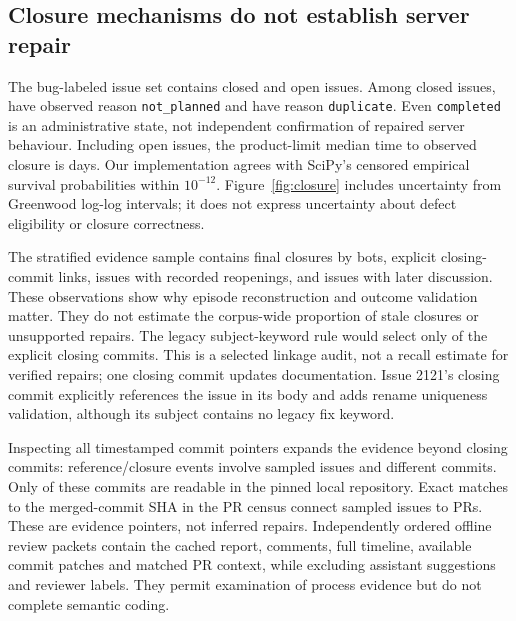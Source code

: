 \documentclass[11pt]{article}
\begin{document}
\subsection{Closure mechanisms do not establish server repair}
The bug-labeled issue set contains \BugClosedCount{} closed and
\BugOpenCount{} open issues. Among closed issues, \BugNotPlannedCount{} have
observed reason \texttt{not\_planned} and \BugDuplicateCount{} have reason
\texttt{duplicate}. Even \texttt{completed} is an administrative state, not
independent confirmation of repaired server behaviour. Including open issues,
the product-limit median time to observed closure is \BugClosureMedian{} days.
Our implementation agrees with SciPy's censored empirical survival probabilities
within $10^{-12}$. Figure~\ref{fig:closure} includes uncertainty from Greenwood
log-log intervals; it does not express uncertainty about defect eligibility or
closure correctness.

The stratified evidence sample contains \EvidenceBotClosures{} final closures
by bots, \EvidenceClosingCommits{} explicit closing-commit links,
\EvidenceReopened{} issues with recorded reopenings, and
\EvidencePostClosureDiscussion{} issues with later discussion. These observations
show why episode reconstruction and outcome validation matter. They do not
estimate the corpus-wide proportion of stale closures or unsupported repairs.
The legacy subject-keyword rule would select only
\ClosingCommitKeywordMatches{} of the \ClosingCommitKeywordCases{} explicit
closing commits. This is a selected linkage audit, not a recall estimate for
verified repairs; one closing commit updates documentation. Issue 2121's closing
commit explicitly references the issue in its body and adds rename uniqueness
validation, although its subject contains no legacy fix keyword.

Inspecting all timestamped commit pointers expands the evidence beyond closing
commits: \EvidenceCommitRefEvents{} reference/closure events involve
\EvidenceCommitRefCases{} sampled issues and \EvidenceDistinctCommitRefs{}
different commits. Only \EvidenceLocalCommitRefs{} of these commits are readable
in the pinned local repository. Exact matches to the merged-commit SHA in the
PR census connect \EvidenceMergeCommitLinkedCases{} sampled issues to
\EvidenceMergeCommitLinkedPRs{} PRs. These are evidence pointers, not inferred
repairs. Independently ordered offline review packets contain the cached report,
comments, full timeline, available commit patches and matched PR context, while
excluding assistant suggestions and reviewer labels. They permit examination of
process evidence but do not complete semantic coding.
\end{document}
